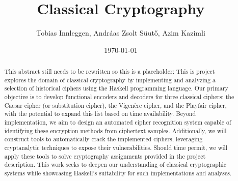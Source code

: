 \documentclass[12pt,a4paper]{article}
\title{Classical Cryptography}
\author{Tobias Innleggen, Andráas Zsolt Süutő, Azim Kazimli}
\date{\today}
\begin{document}
\maketitle

\begin{abstract}
    This abstract still needs to be rewritten so this is a placeholder:
    This is project explores the domain of classical cryptography by implementing and analyzing 
    a selection of historical ciphers using the Haskell programming language. 
    Our primary objective is to develop functional encoders and decoders for three classical ciphers: 
    the Caesar cipher (or substitution cipher), the Vigen\`{e}re cipher, and the Playfair cipher, 
    with the potential to expand this list based on time availability. 
    Beyond implementation, we aim to design an automated cipher recognition system capable of 
    identifying these encryption methods from ciphertext samples. Additionally, we will construct 
    tools to automatically crack the implemented ciphers, leveraging cryptanalytic techniques to 
    expose their vulnerabilities. 
    Should time permit, we will apply these tools to solve cryptography assignments provided 
    in the project description. 
    This work seeks to deepen our understanding of classical cryptographic systems while 
    showcasing Haskell’s suitability for such implementations and analyses.
\end{abstract}

\vfill

\tableofcontents

\clearpage
























\end{document}
